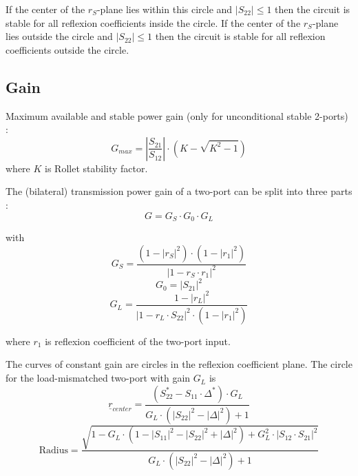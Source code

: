 If the center of the $r_S$-plane lies within this circle and $|S_{22}|
\le 1$ then the circuit is stable for all reflexion coefficients
inside the circle.  If the center of the $r_S$-plane lies outside the
circle and $|S_{22}| \le 1$ then the circuit is stable for all
reflexion coefficients outside the circle.

\subsection{Gain}

Maximum available and stable power gain (only for unconditional stable
2-ports) \cite{Michel1}:
\begin{equation}
G_{max} = \left| \frac{S_{21}}{S_{12}} \right| \cdot \left( K - \sqrt{K^2-1} \right)
\end{equation}
where $K$ is Rollet stability factor.

\addvspace{12pt}

The (bilateral) transmission power gain of a two-port can be split
into three parts \cite{Michel1}:
\begin{equation}
G = G_S \cdot G_0 \cdot G_L
\end{equation}

with
\begin{equation}
G_S = \frac{(1 - |r_S|^2) \cdot (1 - |r_1|^2)}{|1 - r_S\cdot r_1|^2}
\end{equation}
\begin{equation}
G_0 = |S_{21}|^2
\end{equation}
\begin{equation}
G_L = \frac{1 - |r_L|^2}{|1 - r_L\cdot S_{22}|^2 \cdot (1 - |r_1|^2)}
\end{equation}

where $r_1$ is reflexion coefficient of the two-port input.

\addvspace{12pt}

The curves of constant gain are circles in the reflexion coefficient
plane.  The circle for the load-mismatched two-port with gain $G_L$ is
\begin{equation}
\underline{r}_{center} = \frac{(S_{22}^* - S_{11}\cdot \Delta^*) \cdot G_L}{G_L\cdot (|S_{22}|^2 - |\Delta|^2) + 1}
\end{equation}
\begin{equation}
\text{Radius} =
   \frac{\sqrt{1 - G_L\cdot (1-|S_{11}|^2-|S_{22}|^2+|\Delta|^2) + G_L^2\cdot |S_{12}\cdot S_{21}|^2}}
        {G_L\cdot (|S_{22}|^2 - |\Delta|^2) + 1}
\end{equation}

